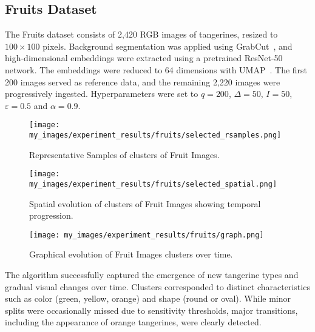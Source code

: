 
\subsection{Fruits Dataset}\label{subsec:fruits}

The Fruits dataset consists of 2,420 RGB images of tangerines, resized to $100
    \times 100$ pixels. Background segmentation was applied using
GrabCut~\cite{grabcut}, and high-dimensional embeddings were extracted using a
pretrained ResNet-50~\cite{resnet} network. The embeddings were reduced to 64
dimensions with UMAP~\cite{umap}. The first 200 images served as reference
data, and the remaining 2,220 images were progressively ingested.
Hyperparameters were set to $q=200$, $\Delta=50$, $I=50$, $\varepsilon=0.5$ and
$\alpha=0.9$.

\begin{figure}[H]
    \centering
    \texttt{[image: my\_images/experiment\_results/fruits/selected\_rsamples.png]}
    \caption{Representative Samples of clusters of Fruit Images.}
\end{figure}

\begin{figure}[H]
    \centering
    \texttt{[image: my\_images/experiment\_results/fruits/selected\_spatial.png]}
    \caption{Spatial evolution of clusters of Fruit Images showing temporal progression.}
\end{figure}

\begin{figure}[H]
    \centering
    \texttt{[image: my\_images/experiment\_results/fruits/graph.png]}
    \caption{Graphical evolution of Fruit Images clusters over time.}
\end{figure}

The algorithm successfully captured the emergence of new tangerine types and
gradual visual changes over time. Clusters corresponded to distinct
characteristics such as color (green, yellow, orange) and shape (round or
oval). While minor splits were occasionally missed due to sensitivity
thresholds, major transitions, including the appearance of orange tangerines,
were clearly detected.
